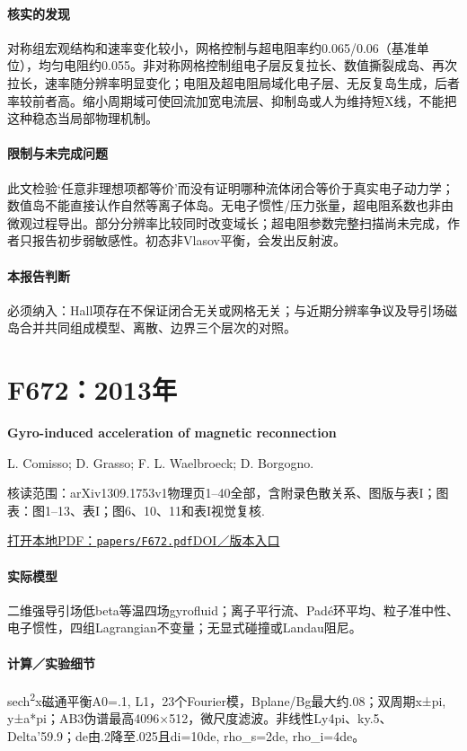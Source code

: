 \paragraph{核实的发现}对称组宏观结构和速率变化较小，网格控制与超电阻率约0.065/0.06（基准单位），均匀电阻约0.055。非对称网格控制组电子层反复拉长、数值撕裂成岛、再次拉长，速率随分辨率明显变化；电阻及超电阻局域化电子层、无反复岛生成，后者率较前者高。缩小周期域可使回流加宽电流层、抑制岛或人为维持短X线，不能把这种稳态当局部物理机制。

\paragraph{限制与未完成问题}此文检验‘任意非理想项都等价’而没有证明哪种流体闭合等价于真实电子动力学；数值岛不能直接认作自然等离子体岛。无电子惯性/压力张量，超电阻系数也非由微观过程导出。部分分辨率比较同时改变域长；超电阻参数完整扫描尚未完成，作者只报告初步弱敏感性。初态非Vlasov平衡，会发出反射波。

\paragraph{本报告判断}必须纳入：Hall项存在不保证闭合无关或网格无关；与近期分辨率争议及导引场磁岛合并共同组成模型、离散、边界三个层次的对照。

\section{F672：2013年}\label{paper:F672}

\textbf{Gyro-induced acceleration of magnetic reconnection}\citep{F672}\

L. Comisso;  D. Grasso;  F. L. Waelbroeck;  D. Borgogno.

\textsf{核读范围：}arXiv1309.1753v1物理页1–40全部，含附录色散关系、图版与表I；\textsf{图表：}图1–13、表I；图6、10、11和表I视觉复核.

\href{run:papers/F672.pdf}{打开本地PDF：\texttt{papers/F672.pdf}}\quad\href{https://doi.org/10.1063/1.4821840}{DOI／版本入口}

\paragraph{实际模型}二维强导引场低beta等温四场gyrofluid；离子平行流、Padé环平均、粒子准中性、电子惯性，四组Lagrangian不变量；无显式碰撞或Landau阻尼。

\paragraph{计算／实验细节}sech\textsuperscript{2}x磁通平衡A0=.1, L1，23个Fourier模，Bplane/Bg最大约.08；双周期x±pi, y±a*pi；AB3伪谱最高4096×512，微尺度滤波。非线性Ly4pi、ky.5、Delta'59.9；de由.2降至.025且di=10de, rho\_s=2de, rho\_i=4de。

